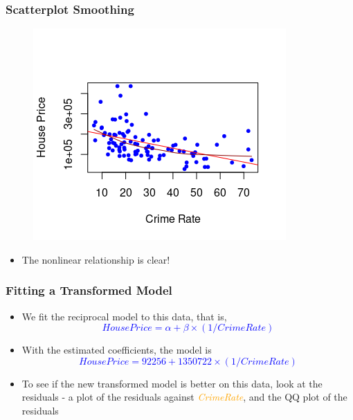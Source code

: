 \documentclass[compress]{beamer}
\begin{document}
\begin{frame}
\frametitle{\sc Scatterplot Smoothing}
    \begin{figure}[!ht]
		\centering
		\includegraphics[scale=0.8]{figs8/scatter-smooth.png}
	\end{figure}
\begin{itemize}
\item The nonlinear relationship is clear!
\end{itemize}
\end{frame}

\begin{frame}
\frametitle{\sc Fitting a Transformed Model}
	\begin{itemize}
	\item We fit the reciprocal model to this data, that is, 
\textcolor{blue}{\[
HousePrice = \alpha + \beta \times (1/CrimeRate)
\]}
	\item With the estimated coefficients, the model is 
\textcolor{blue}{\[
HousePrice  = 92256 + 1350722 \times (1/CrimeRate)
\]}
	\item To see if the new transformed model is better on this data, look at the residuals - a plot of the residuals against \textcolor{orange}{\textit{CrimeRate}}, and the QQ plot of the residuals
	\end{itemize}
\end{frame}
\end{document}
